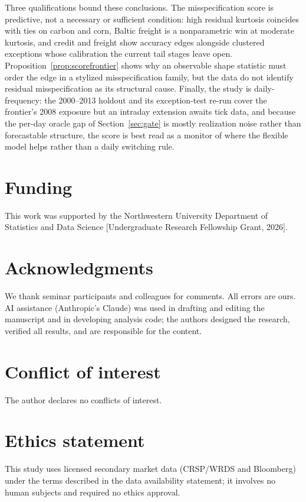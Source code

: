 \documentclass[11pt]{article}
\theoremstyle{remark}
\begin{document}
Three qualifications bound these conclusions. The misspecification score
is predictive, not a necessary or sufficient condition: high residual
kurtosis coincides with ties on carbon and corn, Baltic freight is a
nonparametric win at moderate kurtosis, and credit and freight show
accuracy edges alongside clustered exceptions whose calibration the
current tail stages leave open. Proposition~\ref{prop:scorefrontier}
shows why an observable shape statistic must order the edge in a stylized
misspecification family, but the data do not identify residual
misspecification as its structural cause. Finally, the study is
daily-frequency: the 2000--2013 holdout and its exception-test re-run
cover the frontier's 2008 exposure but an intraday extension awaits tick
data, and because the per-day oracle gap of Section~\ref{sec:gate} is
mostly realization noise rather than forecastable structure, the score is
best read as a monitor of where the flexible model helps rather than a
daily switching rule.

\section*{Funding}
This work was supported by the Northwestern University Department of
Statistics and Data Science [Undergraduate Research Fellowship Grant,
2026].

\section*{Acknowledgments}
We thank seminar participants and colleagues for comments. All errors
are ours.
AI assistance (Anthropic's Claude) was used in drafting and editing
the manuscript and in developing analysis code; the authors designed
the research, verified all results, and are responsible for the
content.

\section*{Conflict of interest}
The author declares no conflicts of interest.

\section*{Ethics statement}
This study uses licensed secondary market data (CRSP/WRDS and
Bloomberg) under the terms described in the data availability
statement; it involves no human subjects and required no ethics
approval.
\end{document}
